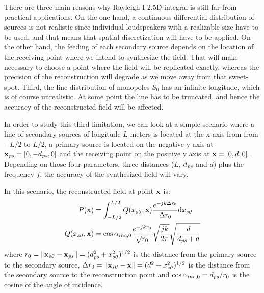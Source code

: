 There are three main reasons why Rayleigh I 2.5D integral is still far from practical applications. On the one hand, a continuous differential distribution of sources is not realistic since individual loudspeakers with a realizable size have to be used, and that means that spatial discretization will have to be applied. On the other hand, the feeding of each secondary source depends on the location of the receiving point where we intend to synthesize the field. That will make necessary to choose a point where the field will be replicated exactly, whereas the precision of the reconstruction will degrade as we move away from that sweet-spot. Third, the line distribution of monopoles $S_0$ has an infinite longitude, which is of course unrealistic. At some point the line has to be truncated, and hence the accuracy of the reconstructed field will be affected.

In order to study this third limitation, we can look at a simple scenario where a line of secondary sources of longitude $L$ meters is located at the x axis from from $-L/2$ to $L/2$, a primary source is located on the negative y axis at $\PosTheo[primarySource] = [0, -d_{\PosTheoSubInd[primarySource]}, 0]$ and the receiving point on the positive y axis at $\PosTheo = [0, d, 0]$. Depending on those four parameters, three distances ($L$, $d_{\PosTheoSubInd[primarySource]}$ and $d$) plus the frequency $f$, the accuracy of the synthesized field will vary.

In this scenario, the reconstructed field at point $\PosTheo$ is:
\begin{equation}
\begin{aligned}
P(\PosTheo) &= \int_{-L/2}^{L/2} Q(x_{\PosTheoSubInd[section]}, \PosTheo) \frac{e^{-jk\distLinePoint}}{\distLinePoint} \mathrm{d}x_{\PosTheoSubInd[section]}\\
Q(x_{\PosTheoSubInd[section]}, \PosTheo) &= \cos\normPrimaryPropAngleSection \frac{e^{-jk\distLinePrimSource}}{\sqrt{\distLinePrimSource}} \sqrt{\frac{j k}{2\pi}} \sqrt{\frac{d}{d_{\PosTheoSubInd[primarySource]} + d}}
\end{aligned}
\label{Rayleigh2_5DTruncatedIntegral}
\end{equation}
where $\distLinePrimSource = \norm{\PosTheo[section] - \PosTheo[primarySource]} = (d_{\PosTheoSubInd[primarySource]}^2 + x_{\PosTheoSubInd[section]}^2)^{1/2}$ is the distance from the primary source to the secondary source, $\distLinePoint = \norm{\PosTheo[section] - \PosTheo} = (d^2 + x_{\PosTheoSubInd[section]}^2)^{1/2}$ is the distance from the secondary source to the reconstruction point and $\cos\normPrimaryPropAngleSection = d_{\PosTheoSubInd[primarySource]}/\distLinePrimSource$ is the cosine of the angle of incidence.

